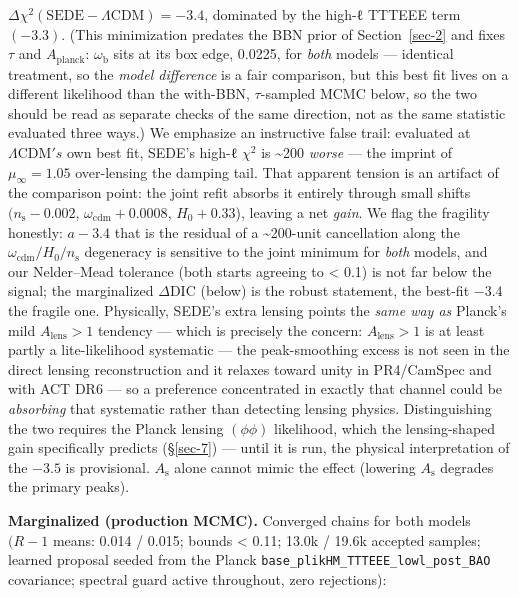 \documentclass[preprint,12pt]{elsarticle}
\begin{document}
\textbf{\(\Delta \chi ^{2}(\mathrm{SEDE}-\Lambda \mathrm{CDM}) = -3.4\)},
dominated by the high-ℓ TTTEEE term \((-3.3)\). (This minimization
predates the BBN prior of Section~\ref{sec-2} and fixes \(\tau\) and
\(A_{\mathrm{planck}}\): \(\omega _{\mathrm{b}}\) sits at its box edge,
0.0225, for \emph{both} models --- identical treatment, so the
\emph{model difference} is a fair comparison, but this best fit lives on
a different likelihood than the with-BBN, \(\tau\)-sampled MCMC below,
so the two should be read as separate checks of the same direction, not
as the same statistic evaluated three ways.) We emphasize an instructive
false trail: evaluated at \(\Lambda \mathrm{CDM}'s\) own best fit,
SEDE's high-ℓ \(\chi ^{2}\) is \textasciitilde200 \emph{worse} --- the
imprint of \(\mu _\infty  = 1.05\) over-lensing the damping tail. That
apparent tension is an artifact of the comparison point: the joint refit
absorbs it entirely through small shifts \((n_{\mathrm{s}} -0.002\),
\(\omega _{\mathrm{cdm}} +0.0008\), \(H_{0} +0.33\)), leaving a net
\emph{gain}. We flag the fragility honestly: \(a -3.4\) that is the
residual of a \textasciitilde200-unit cancellation along the
\(\omega _{\mathrm{cdm}}/H_{0}/n_{\mathrm{s}}\) degeneracy is sensitive
to the joint minimum for \emph{both} models, and our Nelder--Mead
tolerance (both starts agreeing to \textless{} 0.1) is not far below the
signal; the marginalized \(\Delta \mathrm{DIC}\) (below) is the robust
statement, the best-fit \(-3.4\) the fragile one. Physically, SEDE's
extra lensing points the \emph{same way as} Planck's mild
\(A_{\mathrm{lens}} > 1\) tendency
\citep{Planck:2018vyg, Calabrese:2008rt} --- which is precisely the
concern: \(A_{\mathrm{lens}} > 1\) is at least partly a lite-likelihood
systematic --- the peak-smoothing excess is not seen in the direct
lensing reconstruction
\citep{Motloch:2018pjy, Motloch:2019gux, Addison:2023fqc} and it relaxes
toward unity in PR4/CamSpec and with ACT DR6
\citep{AtacamaCosmologyTelescope:2025blo} --- so a preference
concentrated in exactly that channel could be \emph{absorbing} that
systematic rather than detecting lensing physics. Distinguishing the two
requires the Planck lensing \((\phi \phi )\) likelihood, which the
lensing-shaped gain specifically predicts (§\ref{sec-7}) --- until it is
run, the physical interpretation of the \(-3.5\) is provisional.
\(A_{\mathrm{s}}\) alone cannot mimic the effect (lowering
\(A_{\mathrm{s}}\) degrades the primary peaks).

\textbf{Marginalized (production MCMC).} Converged chains for both
models \((R-1\) means: 0.014 / 0.015; bounds \textless{} 0.11; 13.0k /
19.6k accepted samples; learned proposal seeded from the Planck
\texttt{base\_\allowbreak plikHM\_\allowbreak TTTEEE\_\allowbreak lowl\_\allowbreak post\_\allowbreak BAO} covariance; spectral
guard active throughout, zero rejections):
\end{document}
